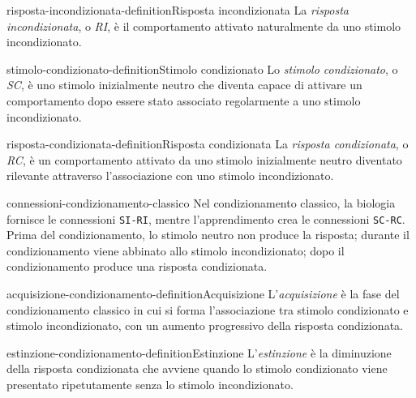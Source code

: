 \documentclass[preview]{standalone}
\begin{document}
\begin{snippetdefinition}{risposta-incondizionata-definition}{Risposta incondizionata}
    La \emph{risposta incondizionata}, o \emph{RI}, è il comportamento attivato
    naturalmente da uno stimolo incondizionato.
\end{snippetdefinition}

\begin{snippetdefinition}{stimolo-condizionato-definition}{Stimolo condizionato}
    Lo \emph{stimolo condizionato}, o \emph{SC}, è uno stimolo inizialmente
    neutro che diventa capace di attivare un comportamento dopo essere stato
    associato regolarmente a uno stimolo incondizionato.
\end{snippetdefinition}

\begin{snippetdefinition}{risposta-condizionata-definition}{Risposta condizionata}
    La \emph{risposta condizionata}, o \emph{RC}, è un comportamento attivato da
    uno stimolo inizialmente neutro diventato rilevante attraverso
    l'associazione con uno stimolo incondizionato.
\end{snippetdefinition}

\begin{snippet}{connessioni-condizionamento-classico}
    Nel condizionamento classico, la biologia fornisce le connessioni
    \texttt{SI-RI}, mentre l'apprendimento crea le connessioni
    \texttt{SC-RC}. Prima del condizionamento, lo stimolo neutro non produce la
    risposta; durante il condizionamento viene abbinato allo stimolo
    incondizionato; dopo il condizionamento produce una risposta condizionata.
\end{snippet}

\begin{snippetdefinition}{acquisizione-condizionamento-definition}{Acquisizione}
    L'\emph{acquisizione} è la fase del condizionamento classico in cui si forma
    l'associazione tra stimolo condizionato e stimolo incondizionato, con un
    aumento progressivo della risposta condizionata.
\end{snippetdefinition}

\begin{snippetdefinition}{estinzione-condizionamento-definition}{Estinzione}
    L'\emph{estinzione} è la diminuzione della risposta condizionata che avviene
    quando lo stimolo condizionato viene presentato ripetutamente senza lo
    stimolo incondizionato.
\end{snippetdefinition}
\end{document}
